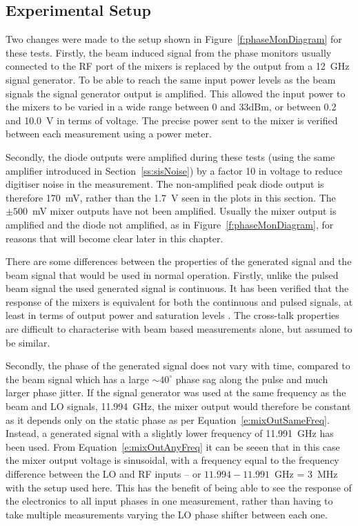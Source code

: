 \subsection{Experimental Setup}
\label{ss:sigGenSetup}

Two changes were made to the setup shown in Figure~\ref{f:phaseMonDiagram} for these tests. Firstly, the beam induced signal from the phase monitors usually connected to the RF port of the mixers is replaced by the output from a 12~GHz signal generator. To be able to reach the same input power levels as the beam signals the signal generator output is amplified. This allowed the input power to the mixers to be varied in a wide range between 0 and 33dBm, or between 0.2 and 10.0~V in terms of voltage. The precise power sent to the mixer is verified between each measurement using a power meter. 

Secondly, the diode outputs were amplified during these tests (using the same amplifier introduced in Section~\ref{ss:sisNoise}) by a factor 10 in voltage to reduce digitiser noise in the measurement. The non-amplified peak diode output is therefore 170~mV, rather than the 1.7~V seen in the plots in this section. The \(\pm500\)~mV mixer outputs have not been amplified. Usually the mixer output is amplified and the diode not amplified, as in Figure~\ref{f:phaseMonDiagram}, for reasons that will become clear later in this chapter.

There are some differences between the properties of the generated signal and the beam signal that would be used in normal operation. Firstly, unlike the pulsed beam signal the used generated signal is continuous. It has been verified that the response of the mixers is equivalent for both the continuous and pulsed signals, at least in terms of output power and saturation levels \cite{jackFONTOct15}. The cross-talk properties are difficult to characterise with beam based measurements alone, but assumed to be similar.

Secondly, the phase of the generated signal does not vary with time, compared to the beam signal which has a large \(\sim40^\circ\) phase sag along the pulse and much larger phase jitter. If the signal generator was used at the same frequency as the beam and LO signals, 11.994~GHz, the mixer output would therefore be constant as it depends only on the static phase as per Equation~\ref{e:mixOutSameFreq}. Instead, a generated signal with a slightly lower frequency of 11.991~GHz has been used. From Equation~\ref{e:mixOutAnyFreq} it can be seeen that in this case the mixer output voltage is sinusoidal, with a frequency equal to the frequency difference between the LO and RF inputs -- or \(11.994-11.991\)~GHz = 3~MHz with the setup used here. This has the benefit of being able to see the response of the electronics to all input phases in one measurement, rather than having to take multiple measurements varying the LO phase shifter between each one.

